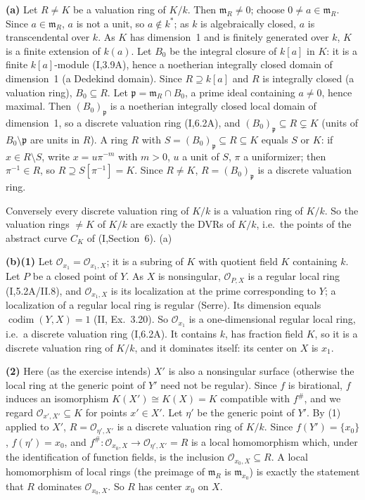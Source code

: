 \documentclass[11pt]{article}
\begin{document}
\textbf{(a)} Let $R\ne K$ be a valuation ring of $K/k$. Then $\mathfrak m_R\neq0$; choose $0\neq a\in\mathfrak m_R$. Since $a\in\mathfrak m_R$, $a$ is not a unit, so $a\notin k^*$; as $k$ is algebraically closed, $a$ is transcendental over $k$. As $K$ has dimension~1 and is finitely generated over $k$, $K$ is a finite extension of $k(a)$. Let $B_0$ be the integral closure of $k[a]$ in $K$: it is a finite $k[a]$-module (I,3.9A), hence a noetherian integrally closed domain of dimension~1 (a Dedekind domain). Since $R\supseteq k[a]$ and $R$ is integrally closed (a valuation ring), $B_0\subseteq R$. Let $\mathfrak p=\mathfrak m_R\cap B_0$, a prime ideal containing $a\ne0$, hence maximal. Then $(B_0)_{\mathfrak p}$ is a noetherian integrally closed local domain of dimension~1, so a discrete valuation ring (I,6.2A), and $(B_0)_{\mathfrak p}\subseteq R\subsetneq K$ (units of $B_0\setminus\mathfrak p$ are units in $R$). A ring $R$ with $S=(B_0)_{\mathfrak p}\subseteq R\subseteq K$ equals $S$ or $K$: if $x\in R\setminus S$, write $x=u\pi^{-m}$ with $m>0$, $u$ a unit of $S$, $\pi$ a uniformizer; then $\pi^{-1}\in R$, so $R\supseteq S[\pi^{-1}]=K$. Since $R\neq K$, $R=(B_0)_{\mathfrak p}$ is a discrete valuation ring.

Conversely every discrete valuation ring of $K/k$ is a valuation ring of $K/k$. So the valuation rings $\ne K$ of $K/k$ are exactly the DVRs of $K/k$, i.e.\ the points of the abstract curve $C_K$ of (I,Section~6). \hfill(a)

\textbf{(b)(1)} Let $\mathcal O_{x_1}=\mathcal O_{x_1,X}$; it is a subring of $K$ with quotient field $K$ containing $k$. Let $P$ be a closed point of $Y$. As $X$ is nonsingular, $\mathcal O_{P,X}$ is a regular local ring (I,5.2A/II.8), and $\mathcal O_{x_1,X}$ is its localization at the prime corresponding to $Y$; a localization of a regular local ring is regular (Serre). Its dimension equals $\operatorname{codim}(Y,X)=1$ (II, Ex.~3.20). So $\mathcal O_{x_1}$ is a one-dimensional regular local ring, i.e.\ a discrete valuation ring (I,6.2A). It contains $k$, has fraction field $K$, so it is a discrete valuation ring of $K/k$, and it dominates itself: its center on $X$ is $x_1$.

\textbf{(2)} Here (as the exercise intends) $X'$ is also a nonsingular surface (otherwise the local ring at the generic point of $Y'$ need not be regular). Since $f$ is birational, $f$ induces an isomorphism $K(X')\cong K(X)=K$ compatible with $f^\#$, and we regard $\mathcal O_{x',X'}\subseteq K$ for points $x'\in X'$. Let $\eta'$ be the generic point of $Y'$. By (1) applied to $X'$, $R=\mathcal O_{\eta',X'}$ is a discrete valuation ring of $K/k$. Since $f(Y')=\{x_0\}$, $f(\eta')=x_0$, and $f^\#:\mathcal O_{x_0,X}\to\mathcal O_{\eta',X'}=R$ is a local homomorphism which, under the identification of function fields, is the inclusion $\mathcal O_{x_0,X}\subseteq R$. A local homomorphism of local rings (the preimage of $\mathfrak m_R$ is $\mathfrak m_{x_0}$) is exactly the statement that $R$ dominates $\mathcal O_{x_0,X}$. So $R$ has center $x_0$ on $X$.
\end{document}
